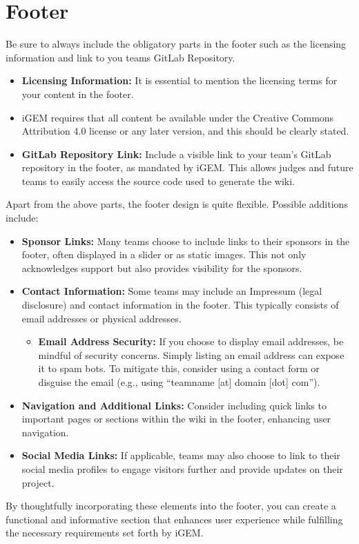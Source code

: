 \section{Footer}
Be sure to always include the obligatory parts in the footer such as the licensing information and link to you teams GitLab Repository.
\begin{itemize}
\item \textbf{Licensing Information:} 
It is essential to mention the licensing terms for your content in the footer.
\item iGEM requires that all content be available under the Creative Commons Attribution 4.0 license or any later version, and this should be clearly stated.

\item \textbf{GitLab Repository Link:}
Include a visible link to your team’s GitLab repository in the footer, as mandated by iGEM. This allows judges and future teams to easily access the source code used to generate the wiki.
\end{itemize}
Apart from the above parts, the footer design is quite flexible.
Possible additions include:
\begin{itemize}
\item \textbf{Sponsor Links:} 
Many teams choose to include links to their sponsors in the footer, often displayed in a slider or as static images.
This not only acknowledges support but also provides visibility for the sponsors.

\item \textbf{Contact Information:}
Some teams may include an Impressum (legal disclosure) and contact information in the footer.
This typically consists of email addresses or physical addresses.
\begin{itemize}
    \item \textbf{Email Address Security:}
    If you choose to display email addresses, be mindful of security concerns.
    Simply listing an email address can expose it to spam bots.
    To mitigate this, consider using a contact form or disguise the email (e.g., using ``teamname [at] domain [dot] com'').
\end{itemize}



\item \textbf{Navigation and Additional Links:}
Consider including quick links to important pages or sections within the wiki in the footer, enhancing user navigation.

\item \textbf{Social Media Links:}
If applicable, teams may also choose to link to their social media profiles to engage visitors further and provide updates on their project.

\end{itemize}
By thoughtfully incorporating these elements into the footer, you can create a functional and informative section that enhances user experience while fulfilling the necessary requirements set forth by iGEM\@.

